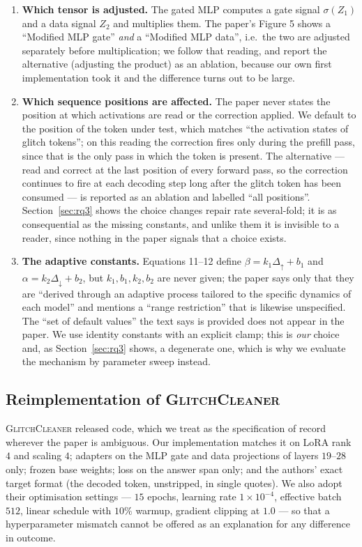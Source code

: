 \documentclass[11pt,a4paper]{article}
\newcommand{\gc}{\textsc{GlitchCleaner}}
\begin{document}
\begin{enumerate}[leftmargin=*]
\item \textbf{Which tensor is adjusted.} The gated MLP computes a gate signal
$\sigma(Z_1)$ and a data signal $Z_2$ and multiplies them. The paper's Figure 5
shows a ``Modified MLP gate'' \emph{and} a ``Modified MLP data'', i.e.\ the two are
adjusted separately before multiplication; we follow that reading, and report the
alternative (adjusting the product) as an ablation, because our own first
implementation took it and the difference turns out to be large.
\item \textbf{Which sequence positions are affected.} The paper never states the
position at which activations are read or the correction applied. We default to
the position of the token under test, which matches ``the activation states of
glitch tokens''; on this reading the correction fires only during the prefill
pass, since that is the only pass in which the token is present. The alternative
--- read and correct at the last position of every forward pass, so the correction
continues to fire at each decoding step long after the glitch token has been
consumed --- is reported as an ablation and labelled ``all positions''.
Section~\ref{sec:rq3} shows the choice changes repair rate several-fold; it is as
consequential as the missing constants, and unlike them it is invisible to a
reader, since nothing in the paper signals that a choice exists.
\item \textbf{The adaptive constants.} Equations 11--12 define
$\beta = k_1\Delta_\uparrow + b_1$ and $\alpha = k_2\Delta_\downarrow + b_2$, but
$k_1, b_1, k_2, b_2$ are never given; the paper says only that they are ``derived
through an adaptive process tailored to the specific dynamics of each model'' and
mentions a ``range restriction'' that is likewise unspecified. The ``set of
default values'' the text says is provided does not appear in the paper. We use
identity constants with an explicit clamp; this is \emph{our} choice and, as
Section~\ref{sec:rq3} shows, a degenerate one, which is why we evaluate the
mechanism by parameter sweep instead.
\end{enumerate}

\subsection{Reimplementation of \gc{}}

\gc{} released code, which we treat as the specification of record wherever the
paper is ambiguous. Our implementation matches it on LoRA rank $4$ and scaling
$4$; adapters on the MLP gate and data projections of layers $19$--$28$ only;
frozen base weights; loss on the answer span only; and the authors' exact target
format (the decoded token, unstripped, in single quotes). We also adopt their
optimisation settings --- $15$ epochs, learning rate $1\times 10^{-4}$, effective
batch $512$, linear schedule with $10\%$ warmup, gradient clipping at $1.0$ ---
so that a hyperparameter mismatch cannot be offered as an explanation for any
difference in outcome.
\end{document}
